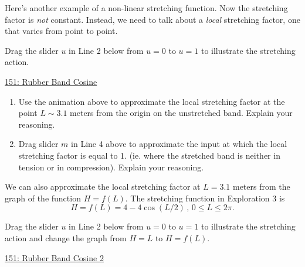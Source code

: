 \documentclass{ximera}
\begin{document}
\begin{example} \label{ExLdfdfthyhhhf}
Here's another example of a non-linear stretching function. Now the stretching factor is \emph{not} constant. Instead, we need to talk about a \emph{local} stretching factor, one that varies from point to point. 

\begin{exploration} \label{ExLdfdfthyhhhf}
Drag the slider $u$ in Line 2 below from $u=0$ to $u=1$ to illustrate the stretching action.
\begin{onlineOnly}
    \begin{center}
\end{center}
\end{onlineOnly}

\href{https://www.desmos.com/calculator/hqvyhormhf}{151: Rubber Band Cosine}
\end{exploration}

\begin{question} \label{Q:9887dfsdfdsf}
\begin{enumerate}
\item Use the animation above to approximate the local stretching factor at the point $L\sim 3.1$ meters from the origin on the unstretched band. Explain your reasoning.

\item Drag slider $m$ in Line 4 above to approximate the input at which the local stretching factor is equal to 1. (ie. where the stretched band is neither in tension or in compression). Explain your reasoning.
\end{enumerate}
\end{question}


We can also approximate the local stretching factor at $L=3.1$ meters from the graph of the function $H=f(L)$. The stretching function in Exploration 3 is
\[
      H = f(L) = 4 - 4\cos (L/2) \, , \, 0\leq L \leq 2\pi.
\]

\begin{exploration} \label{ExLtegfgfgyhhhf}
Drag the slider $u$ in Line 2 below from $u=0$ to $u=1$ to illustrate the stretching action and change the graph from $H=L$ to $H=f(L)$.
\begin{onlineOnly}
    \begin{center}
\end{center}
\end{onlineOnly}

\href{https://www.desmos.com/calculator/dpxbfdwiag}{151: Rubber Band Cosine 2}

\end{exploration}

\end{example}
\end{document}
